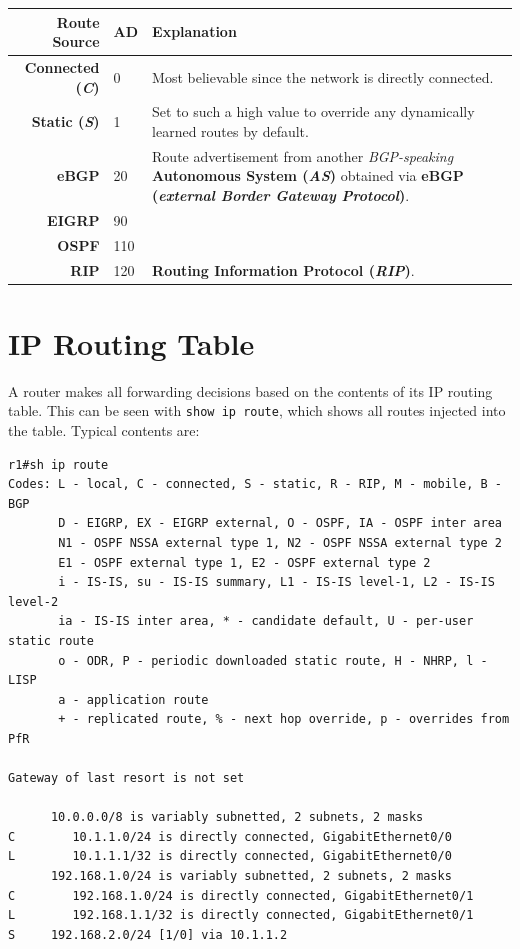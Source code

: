 \vspace{-10pt}
\noindent
\begin{center}
	\begin{tabular}{rlm{}}
		\toprule
		\textbf{Route Source} &\textbf{AD} &\textbf{Explanation} \\
		\midrule
		\textbf{Connected (\textit{C})} &0 &Most believable since the network is directly connected.\\
		\textbf{Static (\textit{S})} &1 &Set to such a high value to override any dynamically learned routes by default.\\
		\textbf{eBGP} &20 &Route advertisement from another \textit{BGP-speaking} \textbf{Autonomous System (\textit{AS})} obtained via \textbf{eBGP (\textit{external Border Gateway Protocol})}.\\
		\textbf{EIGRP} &90 &\\
		\textbf{OSPF} &110 &\\
		\textbf{RIP} &120 &\textbf{Routing Information Protocol (\textit{RIP})}.\\
		\bottomrule
	\end{tabular}
\end{center}

\section{IP Routing Table}
A router makes all forwarding decisions based on the contents of its IP routing table. This can be seen with \verb|show ip route|, which shows all routes injected into the table. Typical contents are:

\vspace{-15pt}
\begin{verbatim}
r1#sh ip route
Codes: L - local, C - connected, S - static, R - RIP, M - mobile, B - BGP
       D - EIGRP, EX - EIGRP external, O - OSPF, IA - OSPF inter area
       N1 - OSPF NSSA external type 1, N2 - OSPF NSSA external type 2
       E1 - OSPF external type 1, E2 - OSPF external type 2
       i - IS-IS, su - IS-IS summary, L1 - IS-IS level-1, L2 - IS-IS level-2
       ia - IS-IS inter area, * - candidate default, U - per-user static route
       o - ODR, P - periodic downloaded static route, H - NHRP, l - LISP
       a - application route
       + - replicated route, % - next hop override, p - overrides from PfR

Gateway of last resort is not set

      10.0.0.0/8 is variably subnetted, 2 subnets, 2 masks
C        10.1.1.0/24 is directly connected, GigabitEthernet0/0
L        10.1.1.1/32 is directly connected, GigabitEthernet0/0
      192.168.1.0/24 is variably subnetted, 2 subnets, 2 masks
C        192.168.1.0/24 is directly connected, GigabitEthernet0/1
L        192.168.1.1/32 is directly connected, GigabitEthernet0/1
S     192.168.2.0/24 [1/0] via 10.1.1.2
\end{verbatim}
\vspace{-10pt}

